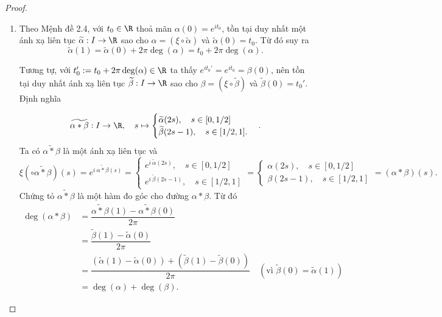 	\begin{proof}
		\begin{enumerate}
			\item %
			
			
			Theo Mệnh đề 2.4, với $t_0\in \R$ thoả mãn $\alpha(0)=e^{it_0}$, tồn tại duy nhất một ánh xạ liên tục $\widetilde{\alpha}:I\to \R$ sao cho $\alpha =(\xi\circ \widetilde{\alpha})$ và %
			$\widetilde{\alpha}(0)=t_0$. Từ đó suy ra 
			\[\widetilde{\alpha}(1)=\widetilde{\alpha}(0)+2\pi\deg(\alpha)=t_0+2\pi\deg(\alpha).\]
			
			Tương tự, với $t_0':=t_0+2\pi\deg(\alpha) \in \R$ %
			ta thấy $e^{it_0'}=e^{it_0}=\beta(0)$, nên tồn tại duy nhất ánh xạ liên tục $\widetilde{\beta}:I\to \R$ sao cho $\beta =(\xi\circ \widetilde{\beta})$ và %
			$\widetilde{\beta}(0)=t_0'$. Định nghĩa
			
			\[\widetilde{\alpha*\beta}: I \to \R, \quad s\mapsto
			\begin{cases}
				\widetilde{\alpha}(2s),\quad s\in [0,1/2]\\
				\widetilde{\beta}(2s-1),\quad s\in [1/2,1].
			\end{cases}.\] 
			Ta có $\widetilde{\alpha*\beta}$ là một ánh xạ liên tục và 
			\[\xi(\circ \widetilde{\alpha*\beta})(s)=e^{i~ \widetilde{\alpha*\beta}(s)}=
			\begin{cases}
				e^{i~\widetilde{\alpha}(2s)},\quad s\in [0,1/2]\\
				e^{i~\widetilde{\beta}(2s-1)},\quad s\in [1/2,1]
			\end{cases}
			=\begin{cases}
				\alpha(2s),\quad s\in [0,1/2]\\
				\beta(2s-1),\quad s\in [1/2,1]
			\end{cases} = (\alpha*\beta)(s).
			\]
			Chứng tỏ $\widetilde{\alpha*\beta}$ là một hàm đo góc cho đường $\alpha*\beta$. Từ đó%
			\begin{align*}
				\deg(\alpha*\beta)&=\dfrac{\widetilde{\alpha*\beta}(1)-\widetilde{\alpha*\beta}(0)}{2\pi}\\
				&=\dfrac{\widetilde{\beta}(1)-\widetilde{\alpha}(0)}{2\pi}\\
				&=\dfrac{(\widetilde{\alpha}(1)-\widetilde{\alpha}(0))+(\widetilde{\beta}(1)-\widetilde{\beta}(0))}{2\pi}\quad (\text{vì } \widetilde{\beta}(0)= \widetilde{\alpha}(1))\\
				&= \deg(\alpha)+\deg(\beta).
			\end{align*}
			

\end{enumerate}
\end{proof}
